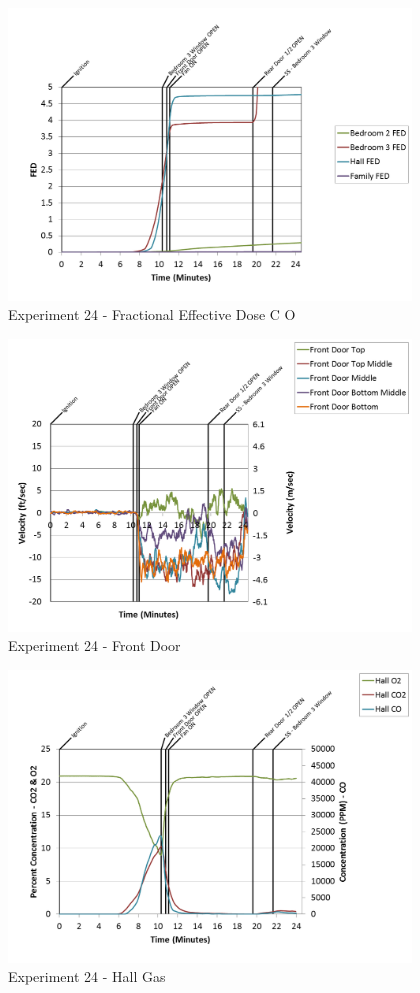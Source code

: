\documentclass{article}
\begin{document}
\begin{appendices}
\begin{figure}[h!]
	\centering
	\includegraphics[height=3.05in]{0_Images/Results_Charts/Exp_24_Charts/FractionalEffectiveDoseCO.png}
	\caption{Experiment 24 - Fractional Effective Dose C O}
\end{figure}

\clearpage

\begin{figure}[h!]
	\centering
	\includegraphics[height=3.05in]{0_Images/Results_Charts/Exp_24_Charts/FrontDoor.png}
	\caption{Experiment 24 - Front Door}
\end{figure}


\begin{figure}[h!]
	\centering
	\includegraphics[height=3.05in]{0_Images/Results_Charts/Exp_24_Charts/HallGas.png}
	\caption{Experiment 24 - Hall Gas}
\end{figure}


\end{appendices}
\end{document}
